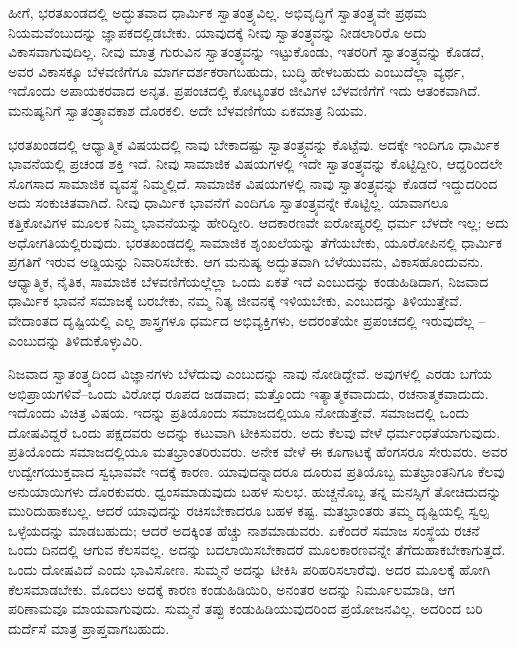 \vskip 0.2cm

ಹೀಗೆ, ಭರತಖಂಡದಲ್ಲಿ ಅದ್ಭುತವಾದ ಧಾರ್ಮಿಕ ಸ್ವಾತಂತ್ರ್ಯವಿಲ್ಲ. ಅಭಿವೃದ್ಧಿಗೆ ಸ್ವಾತಂತ್ರ್ಯವೇ ಪ್ರಥಮ ನಿಯಮವೆಂಬುದನ್ನು ಜ್ಞಾಪಕದಲ್ಲಿಡಬೇಕು. ಯಾವುದಕ್ಕೆ ನೀವು ಸ್ವಾತಂತ್ರ್ಯವನ್ನು ನೀಡಲಾರಿರೊ ಅದು ವಿಕಾಸವಾಗುವುದಿಲ್ಲ. ನೀವು ಮಾತ್ರ ಗುರುವಿನ ಸ್ವಾತಂತ್ರ್ಯವನ್ನು ಇಟ್ಟುಕೊಂಡು, ಇತರರಿಗೆ ಸ್ವಾತಂತ್ರ್ಯವನ್ನು ಕೊಡದೆ, ಅವರ ವಿಕಾಸಕ್ಕೂ ಬೆಳವಣಿಗೆಗೂ ಮಾರ್ಗದರ್ಶಕರಾಗಬಹುದು, ಬುದ್ಧಿ ಹೇಳಬಹುದು ಎಂಬುದೆಲ್ಲಾ ವ್ಯರ್ಥ, ಇದೊಂದು ಅಪಾಯಕರವಾದ ಅನೃತ. ಪ್ರಪಂಚದಲ್ಲಿ ಕೋಟ್ಯಂತರ ಜೀವಿಗಳ ಬೆಳವಣಿಗೆಗೆ ಇದು ಆತಂಕವಾಗಿದೆ. ಮನುಷ್ಯನಿಗೆ ಸ್ವಾತಂತ್ರ್ಯಾವಕಾಶ ದೊರಕಲಿ. ಅದೇ ಬೆಳವಣಿಗೆಯ ಏಕಮಾತ್ರ ನಿಯಮ.

\vskip 0.2cm

ಭರತಖಂಡದಲ್ಲಿ ಆಧ್ಯಾತ್ಮಿಕ ವಿಷಯದಲ್ಲಿ ನಾವು ಬೇಕಾದಷ್ಟು ಸ್ವಾತಂತ್ರ್ಯವನ್ನು ಕೊಟ್ಟೆವು. ಅದಕ್ಕೇ ಇಂದಿಗೂ ಧಾರ್ಮಿಕ ಭಾವನೆಯಲ್ಲಿ ಪ್ರಚಂಡ ಶಕ್ತಿ ಇದೆ. ನೀವು ಸಾಮಾಜಿಕ ವಿಷಯಗಳಲ್ಲಿ ಇದೇ ಸ್ವಾತಂತ್ರ್ಯವನ್ನು ಕೊಟ್ಟಿದ್ದೀರಿ, ಆದ್ದರಿಂದಲೇ ಸೊಗಸಾದ ಸಾಮಾಜಿಕ ವ್ಯವಸ್ಥೆ ನಿಮ್ಮಲ್ಲಿದೆ. ಸಾಮಾಜಿಕ ವಿಷಯಗಳಲ್ಲಿ ನಾವು ಸ್ವಾತಂತ್ರ್ಯವನ್ನು ಕೊಡದೆ ಇದ್ದುದರಿಂದ ಅದು ಸಂಕುಚಿತವಾಗಿದೆ. ನೀವು ಧಾರ್ಮಿಕ ಭಾವನೆಗೆ ಎಂದಿಗೂ ಸ್ವಾತಂತ್ರ್ಯವನ್ನೇ ಕೊಟ್ಟಿಲ್ಲ. ಯಾವಾಗಲೂ ಕತ್ತಿಕೋವಿಗಳ ಮೂಲಕ ನಿಮ್ಮ ಭಾವನೆಯನ್ನು ಹೇರಿದ್ದೀರಿ. ಆದಕಾರಣವೇ ಐರೋಪ್ಯರಲ್ಲಿ ಧರ್ಮ ಬೆಳದೇ ಇಲ್ಲ; ಅದು ಅಧೋಗತಿಯಲ್ಲಿರುವುದು. ಭರತಖಂಡದಲ್ಲಿ ಸಾಮಾಜಿಕ ಶೃಂಖಲೆಯನ್ನು ತೆಗೆಯಬೇಕು, ಯೂರೋಪಿನಲ್ಲಿ ಧಾರ್ಮಿಕ ಪ್ರಗತಿಗೆ ಇರುವ ಅಡ್ಡಿಯನ್ನು ನಿವಾರಿಸಬೇಕು. ಆಗ ಮನುಷ್ಯ ಅದ್ಭುತವಾಗಿ ಬೆಳೆಯುವನು, ವಿಕಾಸಹೊಂದುವನು. ಆಧ್ಯಾತ್ಮಿಕ, ನೈತಿಕ, ಸಾಮಾಜಿಕ ಬೆಳವಣಿಗೆಯಲ್ಲೆಲ್ಲಾ ಒಂದು ಏಕತೆ ಇದೆ ಎಂಬುದನ್ನು ಕಂಡುಹಿಡಿದಾಗ, ನಿಜವಾದ ಧಾರ್ಮಿಕ ಭಾವನೆ ಸಮಾಜಕ್ಕೆ ಬರಬೇಕು, ನಮ್ಮ ನಿತ್ಯ ಜೀವನಕ್ಕೆ ಇಳಿಯಬೇಕು, ಎಂಬುದನ್ನು ತಿಳಿಯುತ್ತೇವೆ. ವೇದಾಂತದ ದೃಷ್ಟಿಯಲ್ಲಿ ಎಲ್ಲ ಶಾಸ್ತ್ರಗಳೂ ಧರ್ಮದ ಅಭಿವ್ಯಕ್ತಿಗಳು, ಅದರಂತೆಯೇ ಪ್ರಪಂಚದಲ್ಲಿ ಇರುವುದೆಲ್ಲ – ಎಂಬುದನ್ನು ತಿಳಿದುಕೊಳ್ಳುವಿರಿ.

\vskip 0.2cm

ನಿಜವಾದ ಸ್ವಾತಂತ್ರ್ಯದಿಂದ ವಿಜ್ಞಾನಗಳು ಬೆಳೆದುವು ಎಂಬುದನ್ನು ನಾವು ನೋಡಿದ್ದೇವೆ. ಅವುಗಳಲ್ಲಿ ಎರಡು ಬಗೆಯ ಅಭಿಪ್ರಾಯಗಳಿವೆ–ಒಂದು ವಿರೋಧ ರೂಪದ ಜಡವಾದ; ಮತ್ತೊಂದು ಇತ್ಯಾತ್ಮಕವಾದುದು, ರಚನಾತ್ಮಕವಾದುದು. ಇದೊಂದು ವಿಚಿತ್ರ ವಿಷಯ. ಇದನ್ನು ಪ್ರತಿಯೊಂದು ಸಮಾಜದಲ್ಲಿಯೂ ನೋಡುತ್ತೇವೆ. ಸಮಾಜದಲ್ಲಿ ಒಂದು ದೋಷವಿದ್ದರೆ ಒಂದು ಪಕ್ಷದವರು ಅದನ್ನು ಕಟುವಾಗಿ ಟೀಕಿಸುವರು. ಅದು ಕೆಲವು ವೇಳೆ ಧರ್ಮಂಧತೆಯಾಗುವುದು. ಪ್ರತಿಯೊಂದು ಸಮಾಜದಲ್ಲಿಯೂ ಮತಭ್ರಾಂತರಿರುವರು. ಅನೇಕ ವೇಳೆ ಈ ಕೂಗಾಟಕ್ಕೆ ಹೆಂಗಸರೂ ಸೇರುವರು. ಅವರ ಉದ್ವೇಗಯುಕ್ತವಾದ ಸ್ವಭಾವವೇ ಇದಕ್ಕೆ ಕಾರಣ. ಯಾವುದನ್ನಾದರೂ ದೂರುವ ಪ್ರತಿಯೊಬ್ಬ ಮತಭ್ರಾಂತನಿಗೂ ಕೆಲವು ಅನುಯಾಯಿಗಳು ದೊರಕುವರು. ಧ್ವಂಸಮಾಡುವುದು ಬಹಳ ಸುಲಭ. ಹುಚ್ಚನೊಬ್ಬ ತನ್ನ ಮನಸ್ಸಿಗೆ ತೋಚಿದುದನ್ನು ಮುರಿದುಹಾಕಬಲ್ಲ. ಆದರೆ ಯಾವುದನ್ನು ರಚಿಸಬೇಕಾದರೂ ಬಹಳ ಕಷ್ಟ. ಮತಭ್ರಾಂತರು ತಮ್ಮ ದೃಷ್ಟಿಯಲ್ಲಿ ಸ್ವಲ್ಪ ಒಳ್ಳೆಯದನ್ನು ಮಾಡಬಹುದು; ಆದರೆ ಅದಕ್ಕಿಂತ ಹೆಚ್ಚು ನಾಶಮಾಡುವರು. ಏಕೆಂದರೆ ಸಮಾಜ ಸಂಸ್ಥೆಯ ರಚನೆ ಒಂದು ದಿನದಲ್ಲಿ ಆಗುವ ಕೆಲಸವಲ್ಲ. ಅದನ್ನು ಬದಲಾಯಿಸಬೇಕಾದರೆ ಮೂಲಕಾರಣವನ್ನೇ ತೆಗೆದುಹಾಕಬೇಕಾಗುತ್ತದೆ. ಒಂದು ದೋಷವಿದೆ ಎಂದು ಭಾವಿಸೋಣ. ಸುಮ್ಮನೆ ಅದನ್ನು ಟೀಕಿಸಿ ಪರಿಹರಿಸಲಾರೆವು. ಅದರ ಮೂಲಕ್ಕೆ ಹೋಗಿ ಕೆಲಸಮಾಡಬೇಕು. ಮೊದಲು ಅದಕ್ಕೆ ಕಾರಣ ಕಂಡುಹಿಡಿಯಿರಿ, ಅನಂತರ ಅದನ್ನು ನಿರ್ಮೂಲಮಾಡಿ, ಆಗ ಪರಿಣಾಮವೂ ಮಾಯವಾಗುವುದು. ಸುಮ್ಮನೆ ತಪ್ಪು ಕಂಡುಹಿಡಿಯುವುದರಿಂದ ಪ್ರಯೋಜನವಿಲ್ಲ. ಅದರಿಂದ ಬರಿ ದುರ್ದೆಸೆ ಮಾತ್ರ ಪ್ರಾಪ್ತವಾಗಬಹುದು.

